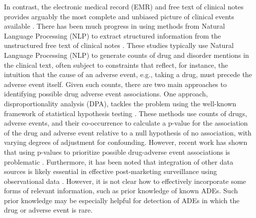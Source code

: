 In contrast, the electronic medical record (EMR) and free text of
clinical notes provides arguably the most complete and unbiased
picture of clinical events available \cite{Poissant2010}. There has
been much progress in using methods from Natural Language Processing
(NLP) to extract structured information from the unstructured free
text of clinical notes \cite{Wang2009,Lependu2013}. These studies
typically use Natural Language Processing (NLP) to generate counts of
drug and disorder mentions in the clinical text, often subject to
constraints that reflect, for instance, the intuition that the cause
of an adverse event, e.g., taking a drug, must precede the adverse
event itself. Given such counts, there are two main approaches to
identifying possible drug adverse event associations. One approach,
disproportionality analysis (DPA), tackles the problem using the
well-known framework of statistical hypothesis testing
\cite{Harpaz2013}. These methods use counts of drugs, adverse events,
and their co-occurrence to calculate a p-value for the association of
the drug and adverse event relative to a null hypothesis of no
association, with varying degrees of adjustment for
confounding. However, recent work has shown that using p-values to
prioritize possible drug-adverse event associations is problematic
\cite{Schuemie2014}. Furthermore, it has been noted that integration
of other data sources is likely essential in effective post-marketing
surveillance using observational data \cite{Ryan2013}. However, it is
not clear how to effectively incorporate some forms of relevant
information, such as prior knowledge of known ADEs. Such prior
knowledge may be especially helpful for detection of ADEs in which the
drug or adverse event is rare.

